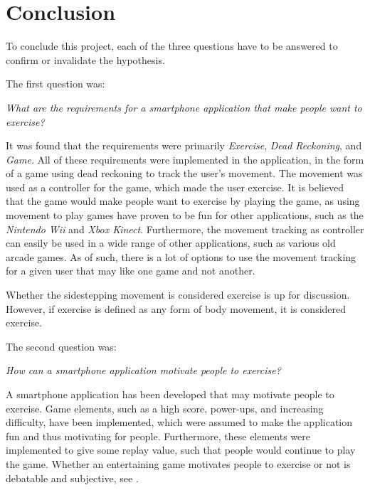 \chapter{Conclusion}
To conclude this project, each of the three questions have to be answered to confirm or invalidate the hypothesis.

The first question was:

\begin{center}
\textit{What are the requirements for a smartphone application that make people want to exercise?}
\end{center}
It was found that the requirements were primarily \textit{Exercise}, \textit{Dead Reckoning}, and \textit{Game}.
All of these requirements were implemented in the application, in the form of a game using dead reckoning to track the user's movement. 
The movement was used as a controller for the game, which made the user exercise.
It is believed that the game would make people want to exercise by playing the game, as using movement to play games have proven to be fun for other applications, such as the \textit{Nintendo Wii} and \textit{Xbox Kinect}.
Furthermore, the movement tracking as controller can easily be used in a wide range of other applications, such as various old arcade games.
As of such, there is a lot of options to use the movement tracking for a given user that may like one game and not another.

Whether the sidestepping movement is considered exercise is up for discussion. 
However, if exercise is defined as any form of body movement, it is considered exercise.

The second question was:

\begin{center}
\textit{How can a smartphone application motivate people to exercise?}
\end{center}


A smartphone application has been developed that may motivate people to exercise.
Game elements, such as a high score, power-ups, and increasing difficulty, have been implemented, which were assumed to make the application fun and thus motivating for people.
Furthermore, these elements were implemented to give some replay value, such that people would continue to play the game.
Whether an entertaining game motivates people to exercise or not is debatable and subjective, see .

